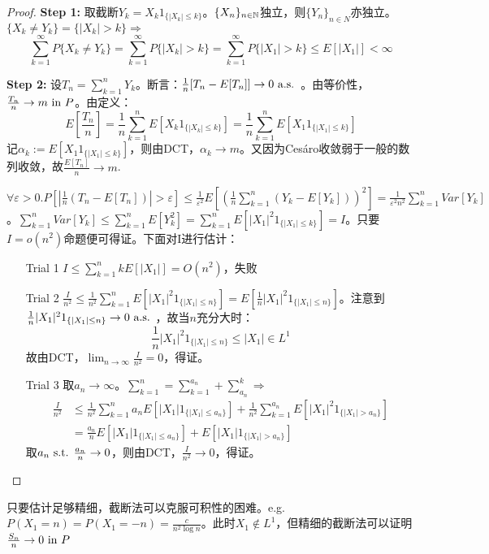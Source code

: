 \documentclass{ctexbook}
\begin{document}
\begin{proof}
  \textbf{Step 1: } 取截断$Y_{k}=X_{k}1_{\{|X_{k}|\leq k\}}$。$\{X_{n}\}_{n\in\mathbb{N}}$独立，则$\{Y_{n}\}_{n\in N}$亦独立。$\{X_{k}\neq Y_{k}\}=\{|X_{k}|>k\}\Rightarrow $
  \[\sum_{k=1}^{\infty}P\{X_{k}\neq Y_{k}\}=\sum_{k=1}^{\infty}P\{|X_{k}|>k\}=\sum_{k=1}^{\infty}P\{|X_{1}|>k\}\leq E[|X_{1}|]<\infty\]

  \textbf{Step 2: } 设$T_{n}=\sum_{k=1}^{n}Y_{k}$。断言：$\frac{1}{n}[T_{n}-E[T_{n}]]\to 0\text{ a.s. }$。由等价性，$\frac{T_{n}}{n}\to m\text{ in } P$。由定义：
  \[E[\frac{T_{n}}{n}]=\frac{1}{n}\sum_{k=1}^{n}E[X_{k}1_{\{|X_{k}|\leq k\}}]=\frac{1}{n}\sum_{k=1}^{n}E[X_{1}1_{\{|X_{1}|\leq k\}}]\]
  记$\alpha_{k}:=E[X_{1}1_{\{|X_{1}|\leq k\}}]$，则由DCT，$\alpha_{k}\to m$。又因为Ces\'aro收敛弱于一般的数列收敛，故$\frac{E[T_{n}]}{n}\to m$.

  $\forall\varepsilon>0. P[|\frac{1}{n}(T_{n}-E[T_{n}])|>\varepsilon]\leq\frac{1}{\varepsilon^{2}}E[(\frac{1}{n}\sum_{k=1}^{n}(Y_{k}-E[Y_{k}]))^{2}]=\frac{1}{\varepsilon^{2}n^{2}}\sum_{k=1}^{n}Var[Y_{k}]$。$\sum_{k=1}^{n}Var[Y_{k}]\leq \sum_{k=1}^{n}E[Y_{k}^{2}]=\sum_{k=1}^{n}E[|X_{1}|^{2}1_{\{|X_{1}|\leq k\}}]=I$。只要$I=o(n^{2})$命题便可得证。下面对I进行估计：
  \begin{enumerate}
  \item[Trial 1] $I\leq \sum_{k=1}^{n}kE[|X_{1}|]=O(n^{2})$，失败
  \item[Trial 2] $\frac{I}{n^{2}}\leq\frac{1}{n^{2}}\sum_{k=1}^{n}E[|X_{1}|^{2}1_{\{|X_{1}|\leq n\}}]=E[\frac{1}{n}|X_{1}|^{2}1_{\{|X_{1}|\leq n\}}]$。注意到$\frac{1}{n}|X_{1}|^{2}1_{\{|X_{1}|\leq n\}}\to 0\text{ a.s. }$，故当$n$充分大时：\[\frac{1}{n}|X_{1}|^{2}1_{\{|X_{1}|\leq n\}}\leq |X_{1}|\in L^{1}\]
    故由DCT，$\lim_{n\to\infty}\frac{I}{n^{2}}=0$，得证。
  \item[Trial 3] 取$a_{n}\to\infty$。$\sum_{k=1}^{n}=\sum_{k=1}^{a_{n}}+\sum_{a_{n}}^{k}\Rightarrow$
    \begin{align*}
      \frac{I}{n^{2}}&\leq \frac{1}{n^{2}}\sum_{k=1}^{n}a_{n}E[|X_{1}|1_{\{|X_{1}|\leq a_{n}\}}]+\frac{1}{n^{2}}\sum_{k=1}^{a_{n}}E[|X_{1}|^{2}1_{\{|X_{1}|>a_{n}\}}]\\
      &=\frac{a_{n}}{n}E[|X_{1}|1_{\{|X_{1}|\leq a_{n}\}}]+E[|X_{1}|1_{\{|X_{1}|>a_{n}\}}]
    \end{align*}
    取$a_{n}\text{ s.t. } \frac{a_{n}}{n}\to 0$，则由DCT，$\frac{I}{n^{2}}\to 0$，得证。 
  \end{enumerate}
\end{proof}

\begin{Rmk}
  只要估计足够精细，截断法可以克服可积性的困难。e.g. $P(X_{1}=n)=P(X_{1}=-n)=\frac{c}{n^{2}\log n}$。此时$X_{1}\not\in L^{1}$，但精细的截断法可以证明$\frac{S_{n}}{n}\to 0\text{ in } P$
\end{Rmk}
\end{document}

